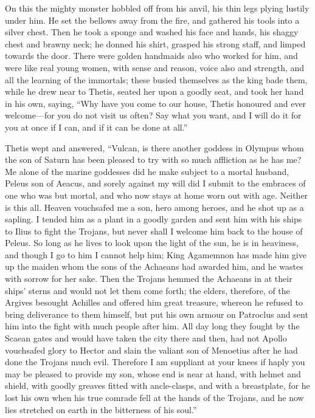 On this the mighty monster hobbled off from his anvil, his thin legs
plying lustily under him. He set the bellows away from the fire, and
gathered his tools into a silver chest. Then he took a sponge and washed
his face and hands, his shaggy chest and brawny neck; he donned his shirt,
grasped his strong staff, and limped towards the door. There were golden
handmaids also who worked for him, and were like real young women, with
sense and reason, voice also and strength, and all the learning of the
immortals; these busied themselves as the king bade them, while he drew
near to Thetis, seated her upon a goodly seat, and took her hand in his
own, saying, “Why have you come to our house, Thetis honoured and ever
welcome—for you do not visit us often? Say what you want, and I will
do it for you at once if I can, and if it can be done at all.”

Thetis wept and answered, “Vulcan, is there another goddess in Olympus
whom the son of Saturn has been pleased to try with so much affliction as
he has me? Me alone of the marine goddesses did he make subject to a
mortal husband, Peleus son of Aeacus, and sorely against my will did I
submit to the embraces of one who was but mortal, and who now stays at
home worn out with age. Neither is this all. Heaven vouchsafed me a son,
hero among heroes, and he shot up as a sapling. I tended him as a plant in
a goodly garden and sent him with his ships to Ilius to fight the Trojans,
but never shall I welcome him back to the house of Peleus. So long as he
lives to look upon the light of the sun, he is in heaviness, and though I
go to him I cannot help him; King Agamemnon has made him give up the
maiden whom the sons of the Achaeans had awarded him, and he wastes with
sorrow for her sake. Then the Trojans hemmed the Achaeans in at their
ships’ sterns and would not let them come forth; the elders, therefore, of
the Argives besought Achilles and offered him great treasure, whereon he
refused to bring deliverance to them himself, but put his own armour on
Patroclus and sent him into the fight with much people after him. All day
long they fought by the Scaean gates and would have taken the city there
and then, had not Apollo vouchsafed glory to Hector and slain the valiant
son of Menoetius after he had done the Trojans much evil. Therefore I am
suppliant at your knees if haply you may be pleased to provide my son,
whose end is near at hand, with helmet and shield, with goodly greaves
fitted with ancle-clasps, and with a breastplate, for he lost his own when
his true comrade fell at the hands of the Trojans, and he now lies
stretched on earth in the bitterness of his soul.”

